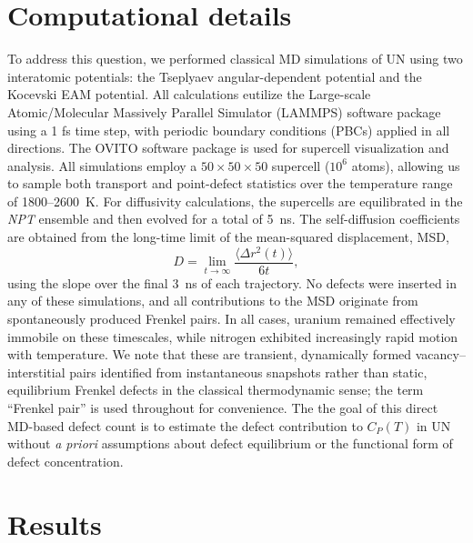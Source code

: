 \documentclass[preprint,12pt,sort&compress]{elsarticle}
\newcommand{\?}{\stackrel{?}{=}}
\begin{document}
\section{Computational details}

To address this question, we performed classical MD simulations of UN using two interatomic potentials: the Tseplyaev angular-dependent potential \cite{Tseplyaev2016} and the Kocevski EAM potential. All calculations eutilize the Large-scale Atomic/Molecular Massively Parallel Simulator (LAMMPS) software package \cite{Plimpton1995, Thompson2022} using a 1 fs time step, with periodic boundary conditions (PBCs) applied in all directions. The OVITO software package \cite{Stukowski2010} is used for supercell visualization and analysis. All simulations employ a $50 \times 50 \times 50$ supercell ($10^6$ atoms), allowing us to sample both transport and point-defect statistics over the  temperature range of 1800--2600~K. For diffusivity calculations, the supercells are equilibrated in the \textit{NPT} ensemble and then evolved for a total of 5~ns. The self-diffusion coefficients are obtained from the long-time limit of the mean-squared displacement, MSD,
\begin{equation}
D = \lim_{t\rightarrow\infty}\frac{\langle \Delta r^{2}(t) \rangle}{6t},
\end{equation}
using the slope over the final 3~ns of each trajectory. No defects were inserted in any of these simulations, and all contributions to the MSD originate from spontaneously produced Frenkel pairs. In all cases, uranium remained effectively immobile on these timescales, while nitrogen exhibited increasingly rapid motion with temperature. We note that these are transient, dynamically formed vacancy–interstitial pairs identified from instantaneous snapshots rather than static, equilibrium Frenkel defects in the classical thermodynamic sense; the term ``Frenkel pair'' is used throughout for convenience. The the goal of this direct MD-based defect count is to estimate the defect contribution to $C_P(T)$ in UN without \textit{a priori} assumptions about defect equilibrium or the functional form of defect concentration.

\section{Results}
\end{document}
